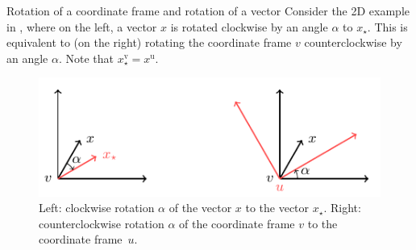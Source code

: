 \begin{myexample}{Rotation of a coordinate frame and rotation of a vector}%
\label{ex:models-rotVectorCoordFrame}%
Consider the 2D example in , where on the left, a vector $x$ is rotated clockwise by an angle $\alpha$ to $x_\star$. This is equivalent to (on the right) rotating the coordinate frame $v$ counterclockwise by an angle $\alpha$. Note that $x^\text{v}_\star = x^\text{u}$.

\begin{figure}
      \centering
      \includegraphics[scale = 1]{figure3_3.pdf}
      \caption[]{Left: clockwise rotation $\alpha$ of the vector $x$ to the vector $x_\star$. Right: counterclockwise rotation $\alpha$ of the coordinate frame $v$ to the coordinate frame~$u$.}
      \label{fig:models-rotateVectorCoordFrame}
\end{figure}
\end{myexample}

